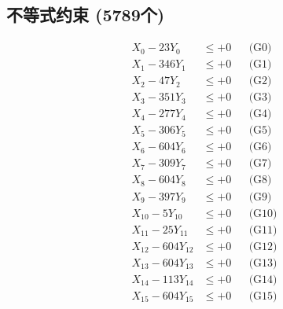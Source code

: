 \documentclass[a4paper,10pt]{article}
\begin{document}
\subsection{不等式约束 (5789个)}

\allowdisplaybreaks
{\small
\begin{align}
\allowbreak
\allowbreak
\allowbreak
\allowbreak
\allowbreak
\allowbreak
\allowbreak
\allowbreak
\allowbreak
\allowbreak
\allowbreak
\allowbreak
\allowbreak
\allowbreak
\allowbreak
\allowbreak
\allowbreak
\allowbreak
\allowbreak
\allowbreak
\allowbreak
\allowbreak
\allowbreak
\allowbreak
\allowbreak
\allowbreak
\allowbreak
\allowbreak
\allowbreak
\allowbreak
\allowbreak
\allowbreak
\allowbreak
\allowbreak
\allowbreak
\allowbreak
\allowbreak
\allowbreak
\allowbreak
\allowbreak
\allowbreak
\allowbreak
\allowbreak
\allowbreak
\allowbreak
\allowbreak
\allowbreak
\allowbreak
\allowbreak
\allowbreak
\allowbreak
\allowbreak
\allowbreak
\allowbreak
\allowbreak
\allowbreak
\allowbreak
\allowbreak
\allowbreak
\allowbreak
\allowbreak
\allowbreak
\allowbreak
\allowbreak
\allowbreak
\allowbreak
\allowbreak
\allowbreak
\allowbreak
\allowbreak
\allowbreak
\allowbreak
\allowbreak
\allowbreak
\allowbreak
\allowbreak
\allowbreak
\allowbreak
X_{0} - 23Y_{0} &\leq +0 && \text{(G0)} \\
\allowbreak
X_{1} - 346Y_{1} &\leq +0 && \text{(G1)} \\
X_{2} - 47Y_{2} &\leq +0 && \text{(G2)} \\
X_{3} - 351Y_{3} &\leq +0 && \text{(G3)} \\
X_{4} - 277Y_{4} &\leq +0 && \text{(G4)} \\
X_{5} - 306Y_{5} &\leq +0 && \text{(G5)} \\
X_{6} - 604Y_{6} &\leq +0 && \text{(G6)} \\
X_{7} - 309Y_{7} &\leq +0 && \text{(G7)} \\
X_{8} - 604Y_{8} &\leq +0 && \text{(G8)} \\
X_{9} - 397Y_{9} &\leq +0 && \text{(G9)} \\
X_{10} - 5Y_{10} &\leq +0 && \text{(G10)} \\
\allowbreak
X_{11} - 25Y_{11} &\leq +0 && \text{(G11)} \\
X_{12} - 604Y_{12} &\leq +0 && \text{(G12)} \\
X_{13} - 604Y_{13} &\leq +0 && \text{(G13)} \\
X_{14} - 113Y_{14} &\leq +0 && \text{(G14)} \\
X_{15} - 604Y_{15} &\leq +0 && \text{(G15)} \\

\end{align}}
\end{document}
